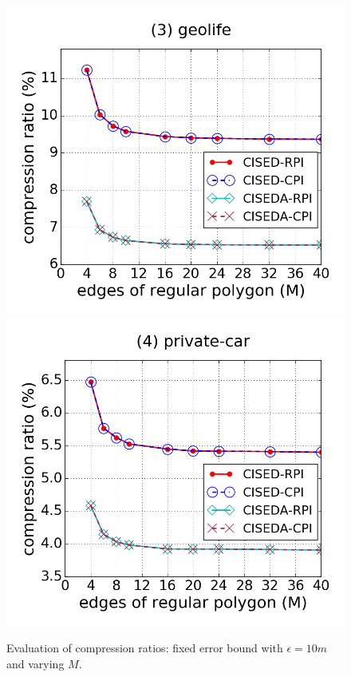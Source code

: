 \begin{figure}[tb!]
\includegraphics[scale = 0.250]{figures/Exp-M-e-20-CR-geolife.png}
\includegraphics[scale = 0.250]{figures/Exp-M-e-20-CR-private.png}
\vspace{-2ex}
\caption{\small Evaluation of compression ratios: fixed error bound with $\epsilon=10m$ and varying $M$.}
\label{fig:m-cr-e20}
\vspace{-2ex}
\end{figure}

